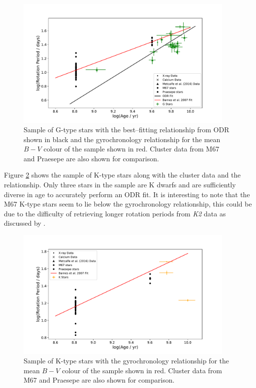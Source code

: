 \begin{figure}
    \centering
    \includegraphics[width=0.95\textwidth]{Figures/5-Activity_rotation/g_prot_v_age.pdf}
    \caption{Sample of G-type stars with the best--fitting relationship from ODR shown in black and the \citet{Barnes_2007} gyrochronology relationship for the mean $B-V$ colour of the sample shown in red. Cluster data from M67 and Praesepe are also shown for comparison.}
    \label{fig:g_prot_v_age}
\end{figure}

Figure \ref{fig:k_prot_v_age} shows the sample of K-type stars along with the cluster data and the \citet{Barnes_2007} relationship. Only three stars in the sample are K dwarfs and are sufficiently diverse in age to accurately perform an ODR fit. It is interesting to note that the M67 K-type stars seem to lie below the gyrochronology relationship, this could be due to the difficulty of retrieving longer rotation periods from \textit{K2} data as discussed by \citet{Esselstein_etal_2018}.

\begin{figure}
    \centering
    \includegraphics[width=0.95\textwidth]{Figures/5-Activity_rotation/k_prot_v_age.pdf}
    \caption{Sample of K-type stars with the \citet{Barnes_2007} gyrochronology relationship for the mean $B-V$ colour of the sample shown in red. Cluster data from M67 and Praesepe are also shown for comparison.}
    \label{fig:k_prot_v_age}
\end{figure}

